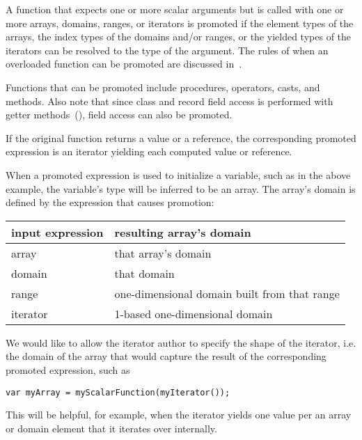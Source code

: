A function that expects one or more scalar arguments but is called
with one or more arrays, domains, ranges, or iterators is promoted if
the element types of the arrays, the index types of the domains and/or
ranges, or the yielded types of the iterators can be resolved to the
type of the argument.  The rules of when an overloaded function can be
promoted are discussed in~.

Functions that can be promoted include procedures, operators, casts,
and methods. Also note that since class and record field access
is performed with getter methods~(), field
access can also be promoted.

If the original function returns a value or a reference, the
corresponding promoted expression is an iterator yielding each
computed value or reference.

When a promoted expression is used to initialize a variable,
such as  in the above example,
the variable's type will be inferred to be an array.
The array's domain is defined by the expression that causes promotion:

\begin{center}
\begin{tabular}[c]{|l|l|}
\hline
input expression & resulting array's domain \\
\hline
array    &  that array's domain \\
domain   &  that domain \\
range    &  one-dimensional domain built from that range \\
iterator &  1-based one-dimensional domain \\
\hline
\end{tabular}
\end{center}

\begin{future}
We would like to allow the iterator author to specify the shape
of the iterator, i.e. the domain of the array that would capture
the result of the corresponding promoted expression, such as
\begin{chapel}
\begin{verbatim}
var myArray = myScalarFunction(myIterator());
\end{verbatim}
\end{chapel}
This will be helpful, for example, when the iterator yields
one value per an array or domain element that it iterates over
internally.
\end{future}

